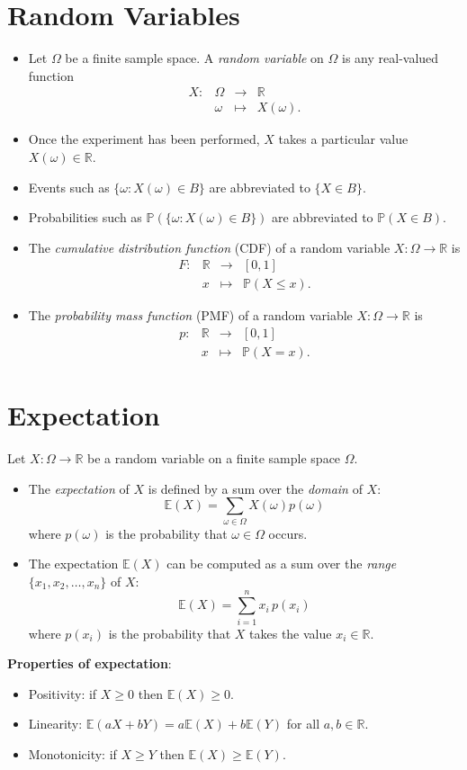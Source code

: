 \documentclass[lecture]{csm}
\newcommand{\prob}{\mathbb{P}}
\newcommand{\expe}{\mathbb{E}}
\newcommand{\R}{\mathbb{R}}
\def\it{\item}
\def\bit{\begin{itemize}}
\def\eit{\end{itemize}}
\begin{document}
\section{Random Variables}
\bit
\it Let $\Omega$ be a finite sample space. A \emph{random variable} on $\Omega$ is any real-valued function 
\[
\begin{array}{rlcl}
X: 	& \Omega & \to  		& \R \\
	& \omega & \mapsto	& X(\omega).
\end{array}
\]	
\it Once the experiment has been performed, $X$ takes a particular value $X(\omega)\in\R$. 
\it Events such as $\{\omega:X(\omega)\in B\}$ are abbreviated to $\{X\in B\}$.
\it Probabilities such as $\prob(\{\omega:X(\omega)\in B\})$ are abbreviated to $\prob(X\in B)$.
\it The \emph{cumulative distribution function} (CDF) of a random variable $X:\Omega\to\R$ is 
\[
\begin{array}{cccl}
F:	& \mathbb{R}	& \longrightarrow	& [0,1] \\
	& x 			& \mapsto			& \prob(X\leq x).
\end{array}
\]
\it
The \emph{probability mass function} (PMF) of a random variable $X:\Omega\to\R$ is 
\[
\begin{array}{cccl}
p:	& \mathbb{R}	& \longrightarrow	& [0,1] \\
	& x 			& \mapsto			& \prob(X = x).
\end{array}
\]
\eit
\newpage
\section{Expectation}
Let $X:\Omega\to\R$ be a random variable on a finite sample space $\Omega$.
\bit
\it  The \emph{expectation} of $X$ is defined by a sum over the \emph{domain} of $X$:
\[
\expe(X) = \sum_{\omega\in\Omega} X(\omega)p(\omega)
\]
where $p(\omega)$ is the probability that $\omega\in\Omega$ occurs.
\it  
The expectation $\expe(X)$ can be computed as a sum over the \emph{range} $\{x_1,x_2,\ldots,x_n\}$ of $X$:
\[
\expe(X) = \sum_{i=1}^n x_i\,p(x_i)
\]
where $p(x_i)$ is the probability that $X$ takes the value $x_i\in\R$.
\eit
\textbf{Properties of expectation}:
\bit
\it Positivity: if $X\geq 0$ then $\expe(X)\geq 0$.
\it Linearity: $\expe(aX+bY) = a\expe(X) + b\expe(Y)$ for all $a,b\in\R$.
\it Monotonicity: if $X\geq Y$ then $\expe(X)\geq\expe(Y)$.
\eit
\newpage
\end{document}
